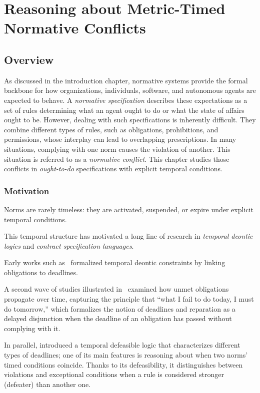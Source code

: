 \chapter{Reasoning about Metric-Timed Normative Conflicts}\label{chap:conflict}

\section{Overview}
\label{sec:overview}

As discussed in the introduction chapter, normative systems provide the formal backbone for how organizations, individuals, software, and autonomous agents are expected to behave. A \emph{normative specification} describes these expectations as a set of rules determining what an agent ought to do or what the state of affairs ought to be. However, dealing with such specifications is inherently difficult. They combine different types of rules, such as obligations, prohibitions, and permissions, whose interplay can lead to overlapping prescriptions. In many situations, complying with one norm causes the violation of another. This situation is referred to as a \emph{normative conflict}.
This chapter studies those conflicts in \emph{ought-to-do} specifications with explicit temporal conditions. 



\subsection{Motivation}

Norms are rarely timeless: they are activated, suspended, or expire under explicit temporal conditions.  

This temporal structure has motivated a long line of research in \emph{temporal deontic logics} and \emph{contract specification languages}.  

Early works such as~\cite{DBLP:conf/hicss/DignumK98,DBLP:conf/deon/BroersenDDM04} formalized temporal deontic constraints by linking obligations to deadlines.  

A second wave of studies illustrated in~\cite{BroersenBrunel2007} examined how unmet obligations propagate over time, capturing the principle that “what I fail to do today, I must do tomorrow,” which formalizes the notion of deadlines and reparation as a delayed disjunction when the deadline of an obligation has passed without complying with it.  

In parallel, \cite{governatori2007characterising,governatori2011justice} introduced a temporal defeasible logic that characterizes different types of deadlines; one of its main features is reasoning about when two norms' timed conditions coincide. Thanks to its defeasibility, it distinguishes between violations and exceptional conditions when a rule is considered stronger (defeater) than another one.

